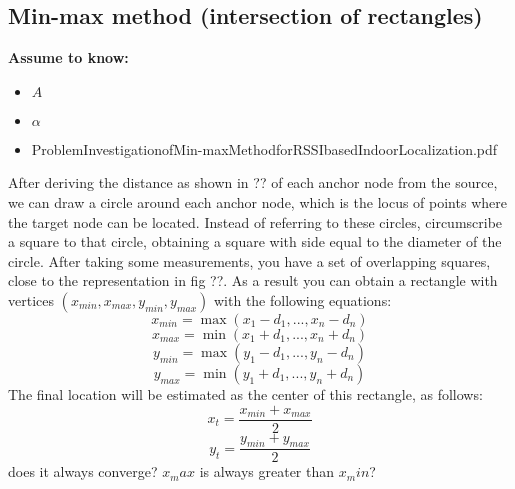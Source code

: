 \documentclass[12pt]{report}
\begin{document}
\subsection{Min-max method (intersection of rectangles)}
  \begin{center}
  \textbf{Assume to know:}
  \begin{itemize}
    \centering
    \item $A$
    \item $\alpha$
  \end{itemize}
  \end{center}
  \begin{itemize}
      \item ProblemInvestigationofMin-maxMethodforRSSIbasedIndoorLocalization.pdf
  \end{itemize}
After deriving the distance as shown in ?? of each anchor node from the source, we can draw a circle around each anchor node, which is the locus of points where the target node can be located. Instead of referring to these circles, circumscribe a square to that circle, obtaining a square with side equal to the diameter of the circle. After taking some measurements, you have a set of overlapping squares, close to the representation in fig ??. As a result you can obtain a rectangle with vertices $(x_{min},x_{max},y_{min},y_{max})$ with the following equations:
\begin{equation}
    x_{min}=\max(x_1-d_1,...,x_n-d_n)
\end{equation}
\begin{equation}
    x_{max}=\min(x_1+d_1,...,x_n+d_n)
\end{equation}
\begin{equation}
    y_{min}=\max(y_1-d_1,...,y_n-d_n)
\end{equation}
\begin{equation}
    y_{max}=\min(y_1+d_1,...,y_n+d_n)
\end{equation}
The final location will be estimated as the center of this rectangle, as follows:
\begin{equation}
    x_t=\frac{x_{min}+x_{max}}{2}
\end{equation}
\begin{equation}
    y_t=\frac{y_{min}+y_{max}}{2}
\end{equation}
does it always converge? $x_max$ is always greater than $x_min$?
\clearpage
\end{document}
